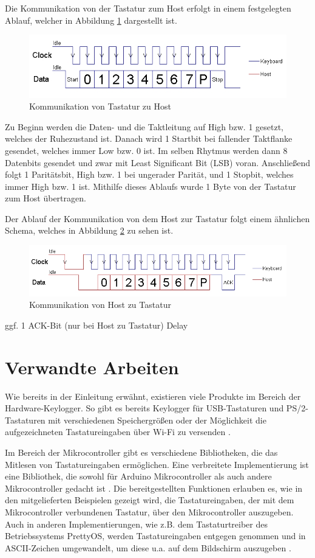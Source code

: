 Die Kommunikation von der Tastatur zum Host erfolgt in einem festgelegten Ablauf, welcher in Abbildung \ref{device_to_host} dargestellt ist.
\begin{figure}
  \centering
  \includegraphics[width=1\textwidth]{images/device_to_host.jpg}
  \caption{Kommunikation von Tastatur zu Host}
  \label{device_to_host}
\end{figure}
Zu Beginn werden die Daten- und die Taktleitung auf High bzw. 1 gesetzt, welches der Ruhezustand ist. Danach wird 1 Startbit bei fallender Taktflanke gesendet, welches immer Low bzw. 0 ist. Im selben Rhytmus werden dann 8 Datenbits gesendet und zwar mit Least Significant Bit (LSB) voran. Anschließend folgt 1 Paritätsbit, High bzw. 1 bei ungerader Parität, und 1 Stopbit, welches immer High bzw. 1 ist. Mithilfe dieses Ablaufs wurde 1 Byte von der Tastatur zum Host übertragen.

Der Ablauf der Kommunikation von dem Host zur Tastatur folgt einem ähnlichen Schema, welches in Abbildung \ref{host_to_device} zu sehen ist.
\begin{figure}
  \centering
  \includegraphics[width=1\textwidth]{images/host_to_device.jpg}
  \caption{Kommunikation von Host zu Tastatur}
  \label{host_to_device}
\end{figure}
ggf. 1 ACK-Bit (nur bei Host zu Tastatur)
Delay


\section{Verwandte Arbeiten}
Wie bereits in der Einleitung erwähnt, existieren viele Produkte im Bereich der Hardware-Keylogger. So gibt es bereits Keylogger für USB-Tastaturen und PS/2-Tastaturen mit verschiedenen Speichergrößen oder der Möglichkeit die aufgezeichneten Tastatureingaben über Wi-Fi zu versenden \cite{keelog}.

Im Bereich der Mikrocontroller gibt es verschiedene Bibliotheken, die das Mitlesen von Tastatureingaben ermöglichen. Eine verbreitete Implementierung ist eine Bibliothek, die sowohl für Arduino Mikrocontroller als auch andere Mikrocontroller gedacht ist \cite{ps2keyboard}. Die bereitgestellten Funktionen erlauben es, wie in den mitgelieferten Beispielen gezeigt wird, die Tastatureingaben, der mit dem Mikrocontroller verbundenen Tastatur, über den Mikrocontroller auszugeben. Auch in anderen Implementierungen, wie z.B. dem Tastaturtreiber des Betriebssystems PrettyOS, werden Tastatureingaben entgegen genommen und in ASCII-Zeichen umgewandelt, um diese u.a. auf dem Bildschirm auszugeben \cite{prettyos}.

